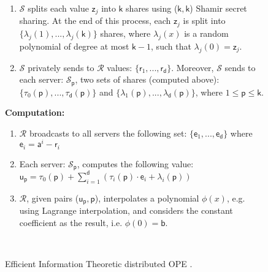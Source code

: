 \begin{figure}[ht]
\begin{center}
\begin{boxedminipage}{11cm}
{\begin{enumerate}
\begin{enumerate}

\end{enumerate}

\item $\mathcal{S}$  splits each value $\mathsf{z}_{\scriptscriptstyle j}$ into $\mathsf{k}$ shares using ($\mathsf{k},\mathsf{k}$) Shamir secret sharing. At the end of this process, each $\mathsf{z}_{\scriptscriptstyle j}$ is split into $\{ \lambda_{\scriptscriptstyle j}(1),..., \lambda_{\scriptscriptstyle j}(\mathsf{k})\}$ shares, where $\lambda_{\scriptscriptstyle j}(x)$ is a random polynomial of degree at most $\mathsf{k}-1$, such that $\lambda_{\scriptscriptstyle j}(0)=\mathsf{z}_{\scriptscriptstyle j}$.

\item $\mathcal{S}$ privately sends to  $\mathcal{R}$ values: $\{\mathsf{r}_{\scriptscriptstyle 1},..., \mathsf{r}_{\scriptscriptstyle \mathsf{d}}\}$. Moreover, $\mathcal{S}$ sends  to each server: $\mathcal{S}_{\scriptscriptstyle  \mathsf{p}}$, two sets of shares (computed above): $\{\tau_{\scriptscriptstyle 0}( \mathsf{p}),..., \tau_{\scriptscriptstyle \mathsf{d}}( \mathsf{p})\}$ and $\{\lambda_{\scriptscriptstyle 1}( \mathsf{p}),..., \lambda_{\scriptscriptstyle \mathsf{d}}( \mathsf{p})\}$, where $1\leq \mathsf{p}\leq \mathsf{k}$. 



\end{enumerate}

\noindent\textbf {Computation:} 
\begin{enumerate}
\item  $\mathcal{R}$ broadcasts to all servers the following set: $\{\mathsf{e}_{\scriptscriptstyle 1 },...,\mathsf{e}_{\scriptscriptstyle \mathsf{d}}\}$ where $\mathsf{e}_{\scriptscriptstyle i}=\mathsf{a}^{\scriptscriptstyle i}-\mathsf{r}_{\scriptscriptstyle i}$


\item Each server: $\mathcal{S}_{\scriptscriptstyle  \mathsf{p}}$, computes the following value: $  \mathsf{u}_{\scriptscriptstyle \mathsf{p}}=\tau_{\scriptscriptstyle 0}( \mathsf{p})+ \sum\limits^{\scriptscriptstyle \mathsf{d}}_{\scriptscriptstyle i=1}(\tau_{\scriptscriptstyle i}( \mathsf{p})\cdot \mathsf{e}_{\scriptscriptstyle i}+\lambda_{\scriptscriptstyle i}( \mathsf{p}))$

\item $\mathcal{R}$, given pairs ($\mathsf{u}_{\scriptscriptstyle \mathsf{p}}, \mathsf{p}$), interpolates a polynomial $\phi(x)$, e.g.  using Lagrange interpolation, and considers the constant coefficient as the result, i.e. $\phi(0)=\mathsf{b}$.


 \end{enumerate}
 \
}


\end{boxedminipage}
\end{center}
\caption{Efficient Information Theoretic distributed OPE \cite{DBLP:conf/icisc/CianciulloG18}.} 
\label{fig:subroutines}
\end{figure}
